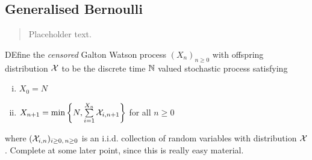 \subsection{Generalised Bernoulli}

\begin{quote}
{\small Placeholder text. }
\end{quote}

DEfine the \textit{censored}  Galton Watson process $(X_n)_{n \geq 0}$ with offspring distribution $\cal{X}$  to be the discrete time $\N$ valued stochastic process satisfying
\begin{enumerate}[(i)]
\item $X_0 = N$
\item $X_{n + 1} = \min\left\{ N, \sum\limits_{i = 1}^{X_n} \cal{X}_{i, n + 1}\right\}$ for all $n \geq 0$
\end{enumerate}
where $(\cal{X}_{i, n})_{i \geq 0,\, n \geq 0}$ is an i.i.d. collection of random variables with distribution $\cal{X}$. Complete at some later point, since this is really easy material. 